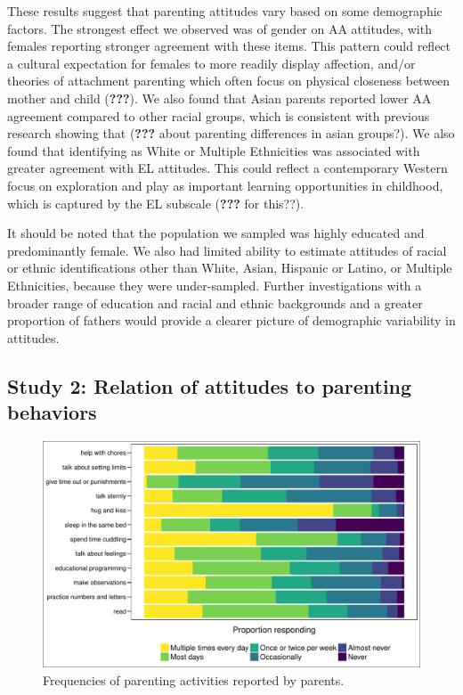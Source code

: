 \documentclass[floatsintext,man]{apa6}
\theoremstyle{definition}
\theoremstyle{definition}
\theoremstyle{definition}
\theoremstyle{remark}
\begin{document}
These results suggest that parenting attitudes vary based on some
demographic factors. The strongest effect we observed was of gender on
AA attitudes, with females reporting stronger agreement with these
items. This pattern could reflect a cultural expectation for females to
more readily display affection, and/or theories of attachment parenting
which often focus on physical closeness between mother and child
({\textbf{???}}). We also found that Asian parents reported lower AA
agreement compared to other racial groups, which is consistent with
previous research showing that ({\textbf{???}} about parenting
differences in asian groups?). We also found that identifying as White
or Multiple Ethnicities was associated with greater agreement with EL
attitudes. This could reflect a contemporary Western focus on
exploration and play as important learning opportunities in childhood,
which is captured by the EL subscale ({\textbf{???}} for this??).

It should be noted that the population we sampled was highly educated
and predominantly female. We also had limited ability to estimate
attitudes of racial or ethnic identifications other than White, Asian,
Hispanic or Latino, or Multiple Ethnicities, because they were
under-sampled. Further investigations with a broader range of education
and racial and ethnic backgrounds and a greater proportion of fathers
would provide a clearer picture of demographic variability in attitudes.

\subsection{Study 2: Relation of attitudes to parenting
behaviors}\label{study-2-relation-of-attitudes-to-parenting-behaviors}

\begin{figure}
\centering
\includegraphics{PAQ_paper_files/figure-latex/behavefreq-1.pdf}
\caption{\label{fig:behavefreq}Frequencies of parenting activities reported
by parents.}
\end{figure}
\end{document}
